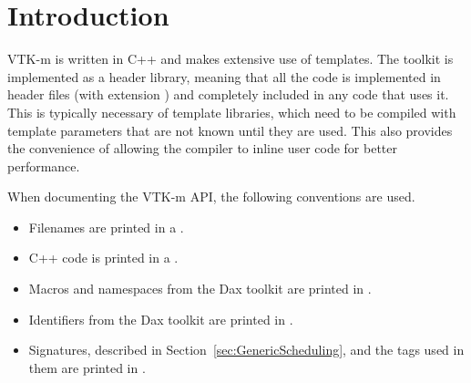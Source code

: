 
\chapter{Introduction}
\label{chap:Introduction}



VTK-m is written in C++ and makes extensive use of templates. The toolkit
is implemented as a header library, meaning that all the code is
implemented in header files (with extension ) and
completely included in any code that uses it.  This is typically necessary of template libraries,
which need to be compiled with template parameters that are not known until
they are used. This also provides the convenience of allowing the compiler
to inline user code for better performance.

When documenting the VTK-m API, the following conventions are used.
\begin{itemize}
\item Filenames are printed in a .
\item C++ code is printed in a .
\item Macros and namespaces from the Dax toolkit are printed
  in .
\item Identifiers from the Dax toolkit are printed in
  .
\item Signatures, described in Section~\ref{sec:GenericScheduling}, and the
  tags used in them are printed in .
\end{itemize}
